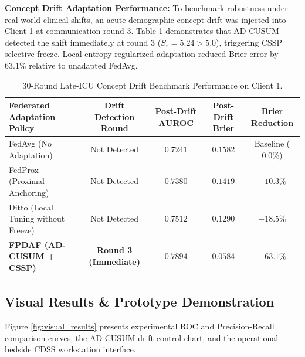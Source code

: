 \documentclass[11pt, a4paper]{article}
\begin{document}
\noindent
\textbf{Concept Drift Adaptation Performance:} To benchmark robustness under real-world clinical shifts, an acute demographic concept drift was injected into Client 1 at communication round 3. Table \ref{tab:drift} demonstrates that AD-CUSUM detected the shift immediately at round 3 ($S_r = 5.24 > 5.0$), triggering CSSP selective freeze. Local entropy-regularized adaptation reduced Brier error by $63.1\%$ relative to unadapted FedAvg.

\begin{table}[!htbp]
    \centering
    \footnotesize
    \renewcommand{\arraystretch}{1.15}
    \begin{tabular}{l c c c c}
        \toprule
        \textbf{Federated Adaptation Policy} & \textbf{Drift Detection Round} & \textbf{Post-Drift AUROC} & \textbf{Post-Drift Brier} & \textbf{Brier Reduction} \\
        \midrule
        FedAvg (No Adaptation) & Not Detected & $0.7241$ & $0.1582$ & Baseline ($0.0\%$) \\
        FedProx (Proximal Anchoring) & Not Detected & $0.7380$ & $0.1419$ & $-10.3\%$ \\
        Ditto (Local Tuning without Freeze) & Not Detected & $0.7512$ & $0.1290$ & $-18.5\%$ \\
        \midrule
        \textbf{FPDAF (AD-CUSUM + CSSP)} & \textbf{Round 3 (Immediate)} & $\mathbf{0.7894}$ & $\mathbf{0.0584}$ & $\mathbf{-63.1\%}$ \\
        \bottomrule
    \end{tabular}
    \caption{30-Round Late-ICU Concept Drift Benchmark Performance on Client 1.}
    \label{tab:drift}
\end{table}

\subsection{Visual Results \& Prototype Demonstration}
\noindent
Figure \ref{fig:visual_results} presents experimental ROC and Precision-Recall comparison curves, the AD-CUSUM drift control chart, and the operational bedside CDSS workstation interface.
\end{document}
